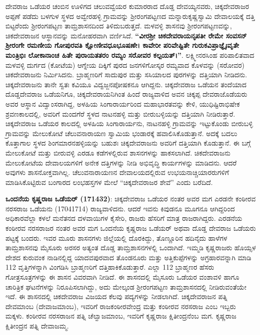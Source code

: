 ದೇವರಾಜ ಒಡೆಯರ ಚಂಬಿನ ಊಳಿಗದ ಚಲುವವ್ವೆಯರ ಕುಮಾರರಾದ ದೊಡ್ಡ ದೇವಯ್ಯನವರು, ಚಿಕ್ಕದೇವರಾಜರ ಅಪ್ಪಣೆ ಪಡೆದು ಬಳಗುಳ ಸ್ಥಳದ ಅವ್ವೇರಹಳ್ಳಿ ಗ್ರಾಮವನ್ನು ಶ‍್ರೀರಂಗಪಟ್ಟಣದ ಮನ್ನಾರುಕೃಷ್ಣಸ್ವಾಮಿ ದೇವಾಲಯಕ್ಕೆ ದತ್ತಿ ಬಿಟ್ಟರೆಂದು ಶ‍್ರೀರಂಗಪಟ್ಟಣ ತಾಮ್ರಶಾಸನದಿಂದ ತಿಳಿದುಬರುತ್ತದೆ. ಮಳವಳ್ಳಿ ಶಾಸನವು ಶ‍್ರೀರಂಗಪಟ್ಟಣವನ್ನು, ಚಿಕದೇವರಾಜನ ಆಸ್ಥಾನವನ್ನು ಮನೋಹರವಾಗಿ ವರ್ಣಿಸಿದೆ. \textbf{“ವೀರಶ‍್ರೀ ಚಿಕದೇವರಾಯನೃಪತೀ ರೇಮೇ ಸಂವಸನ್​ ಶ‍್ರೀರಂಗೇ ರಮಣೀಯ ಗೋಪುರವತಿ ಕ್ಷೋಣೀವಧೂಭೂಷಣೇ। ಕಾವೇರೀ ಪರಿವೇಷ್ಟಿತೇ ಗುರುಕವಿಪ್ರಾಜ್ಞೈಃವೃತೇ ಮಂತ್ರಿಭಿಃ ಲೋಕಾನಾಂಚ ಹಿತೇ ಪುರಾಯತತರಂ ರಮ್ಯಂ ಸರೋವರ ಕಲ್ಪಯತ್​।”}. ಲಕ್ಷ್ಮೀನರಸಿಂಹ ಪರಿಪಾಲಿತವಾದ ಮಳವಳ್ಳಿ ದುರ್ಗದ (ಕೋಟೆಯ) ಆಗ್ನೇಯ ದಿಕ್ಕಿಗೆ ಪುರದ ಜನಗಳಿಗೋಸ್ಕರ ರಮ್ಯವಾದ ಕೊಳವನ್ನು (ಸರೋವರ) ಚಿಕದೇವರಾಜನು ನಿರ್ಮಿಸಿದನು. ಬ್ರಾಹ್ಮಣರಿಗೆ ಸಾದುಪುರ ಮತ್ತು ಸಸಿಯಾಲದ ಪುರಗಳನ್ನು ದತ್ತಿಯಾಗಿ ನೀಡಿದನು. ಚಿಕ್ಕದೇವರಾಜನು ತಾನೇ ಸ್ವತಃ ಕವಿಯೂ ವಿದ್ವಜ್ಜನಪೋಷಕನೂ ಆಗಿದ್ದನು. ಚಿಕ್ಕದೇವರಾಜ ಒಡೆಯನ ತಂದೆಯಾದ ದೊಡ್ಡದೇವರಾಜ ಒಡೆಯನಿಗೂ, ಚಿಕ್ಕದೇವರಾಯನಿಗಿಂತ ಹಿಂದೆ ರಾಜ್ಯವಾಳಿದ ಅವನ ಚಿಕ್ಕಪ್ಪ ದೇವರಾಜೊಡೆಯರು ಅವರ ಆಸ್ಥಾನ ವಿದ್ವಾಂಸ\-ರಾಗಿದ್ದ, ಅಳಹಿಯ ಸಿಂಗಾರಾರ್ಯರಿಂದ ಮಹಾಭಾರತವನ್ನು ಕೇಳಿ, ಯುಧಿಷ್ಟಿರಾಭಿಷೇಕ ಶ್ರವಣಕಾಲದಲ್ಲಿ, ಅವರಿಗೆ ಮಂದಗೆರೆ ಸ್ಥಳದ ನಾಟನಹಳ್ಳಿ ಮತ್ತು ಬೀರುಬಳ್ಳಿಯನ್ನು ದತ್ತಿಯಾಗಿ ನೀಡಿರುತ್ತಾರೆ. ಚಿಕ್ಕದೇವರಾಜ ಒಡೆಯರ ಕಾಲದಲ್ಲಿ ಅಳಹಿಯ ಸಿಂಗಾರಾರ್ಯನು, ನಾಟನಹಳ್ಳಿ ಗ್ರಾಮವನ್ನು ಇಟ್ಟುಕೊಂಡು ಬೀರುಬಳ್ಳಿ ಗ್ರಾಮವನ್ನು ಮೇಲುಕೋಟೆ ಚೆಲುವ\-ನಾರಾಯಣ ಸ್ವಾಮಿಯ ಭಂಡಾರಕ್ಕೆ ಹವಾಲಿಸಿಕೊಡುತ್ತಾನೆ. ಅದಕ್ಕೆ ಬದಲು ಕೊತ್ತಾಗಾಲ ಸ್ಥಳದ ಶಿಂಗಮಾರನಹಳ್ಳಿಯನ್ನು ಬಹುಶಃ ಚಿಕ್ಕದೇವರಾಜನು ಅವರಿಗೆ ದತ್ತಿಯಾಗಿ ಕೊಡುತ್ತಾನೆ. ಈ ಬಗ್ಗೆ ಮೇಲುಕೋಟೆ ಮತ್ತು ಬೀರುವಳ್ಳಿ ಎರಡೂ ಕಡೆಗಳಲ್ಲಿರುವ ಶಾಸನಗಳನ್ನು ಹಾಕಸಲಾಗಿದೆ. ಚಿಕದೇವರಾಜನು ಮೇಲುಕೋಟೆಯ ದೇವಾಲಯಗಳಿಗೆ ಅನೇಕ ದತ್ತಿಗಳನ್ನು ನೀಡಿ ಅಭಿವೃದ್ಧಿ ಕಾರ್ಯಗಳನ್ನು ಮಾಡಿದನು. ಆದರೆ ಅವುಗಳು ಶಾಸನೋಕ್ತವಾಗಿಲ್ಲ. ಚೆಲುವನಾರಾಯಣನ ದೇವಾಲಯದಲ್ಲಿರುವ ಉಭಯನಾಚ್ಚಿಯಾರರುಗಳಿಗೆ ಮಾಡಿಸಿಕೊಟ್ಟಿರುವ ಬಂಗಾರದ ಲಂಭಹಸ್ತಗಳ ಮೇಲೆ “ಚಿಕ್ಕದೇವರಾಜರ ಶೇವೆ” ಎಂದು ಬರೆದಿದೆ.

\textbf{ಒಂದನೆಯ ಕೃಷ್ಣರಾಜ ಒಡೆಯರ್​ (1714\general{\enginline{-}}32)}: ಚಿಕ್ಕದೇವರಾಜ ಒಡೆಯರ ನಂತರ ಅವರ ಮಗ ಎರಡನೇ ಕಂಠೀರವ ನರಸರಾಜ ಒಡೆಯನು (1704\enginline{-}1714) ರಾಜ್ಯವಾಳಿದನು. ಆದರೆ ಇವನು ಕಿವುಡನೂ ಮೂಗನೂ ಆಗಿದ್ದರಿಂದ ಅಧಿಕಾರವೆಲ್ಲಾ ಕಳಲೆ ಮನೆತನದ ದಳವಾಯಿಗಳ ಕೈಸೇರಿ, ರಾಜರು ಹೆಸರಿಗೆ ಮಾತ್ರ ರಾಜರಾಗಿದ್ದರು. ಎರಡನೆಯ ಕಂಠೀರವ ನರಸರಾಜರ ನಂತರ ಅವರ ಮಗ ಒಂದನೆಯ ಕೃಷ್ಣರಾಜ ಒಡೆಯರ್​ ಅಥವಾ ದೊಡ್ಡ ದೇವರಾಜ ಒಡೆಯರು ಪಟ್ಟಕ್ಕೆ ಬಂದರು. ಇವರ ಮೂರು ಶಾಸನಗಳು ಜಿಲ್ಲೆಯಲ್ಲಿ ದೊರಕಿದ್ದು, ತೊಣ್ಣೂರಿನ ಹದಿನೈದು ಹಾಳೆಗಳ ತಾಮ್ರಶಾಸನವು ಮೈಸೂರು ಅರಸರ ಅತ್ಯಂತ ದೊಡ್ಡ ತಾಮ್ರಶಾಸನಗಳಲ್ಲಿ ಒಂದಾಗಿದೆ. ಇಮ್ಮಡಿ ಕೃಷ್ಣರಾಜರು ಹೊಯ್ಸಳ ದೇಶದ ಕುರುವಂಕ ನಾಡಿನಲ್ಲಿದ್ದ ಯಾದವಪುರವಾದ ತೊಂಡನೂರು ಮತ್ತು ಅತ್ತಿಕುಪ್ಪೆಗಳನ್ನು ಅಗ್ರಹಾರವನ್ನಾಗಿ ಮಾಡಿ 112 ವೃತ್ತಿಗಳನ್ನಾಗಿ ವಿಂಗಡಿಸಿ ಬ್ರಾಹ್ಮಣರಿಗೆ ದತ್ತಿಹಾಕಿಕೊಡುತ್ತಾರೆ. ಎಲ್ಲಾ 112 ಬ್ರಾಹ್ಮಣರ ಹೆಸರು ಗೋತ್ರಸೂತ್ರಗಳನ್ನು ಈ ಶಾಸನ ವಿವರವಾಗಿ ನೀಡಿದೆ. ಈ ಶಾಸನದಲ್ಲಿ ಮೈಸೂರು ಒಡೆಯರ ವಂಶಾವಳಿ ಹಾಗೂ ಚಾರಿತ್ರಿಕ ಘಟನೆಗಳನ್ನು ನಿರೂಪಿಸಲಾಗಿದ್ದು, ಅದು ಮೇಲ್ಕಂಡ ಶ‍್ರೀರಂಗಪಟ್ಟಣ ತಾಮ್ರಶಾಸನದಲ್ಲಿ ನೀಡಿರುವಂತೆಯೇ ಇದೆ. ಈ ಶಾಸನದಲ್ಲಿ ಚಿಕದೇವರಾಜ ವಿಜಯದ ಕೆಲವು ಪದ್ಯಗಳನ್ನು ನೀಡಲಾಗಿದೆ. ಚಿಕ್ಕದೇವರಾಜನ ಪತ್ನಿ ದೇವಮಾಂಬ (ದೇವಾಜಮಾಂಬ), ಇವರಿಗೆ ರಾಜಕಂಠೀರವೇಂದ್ರ ಮತ್ತು ಕಂಠೀರವ ನರಸರಾಜ ಎಂಬ ಇಬ್ಬರು ಮಕ್ಕಳು. ಕಂಠೀರವ ನರಸರಾಜನ ಪತ್ನಿ ಚೆಲ್ವಾಜಮಾಂಬ, ಇವರಿಗೆ ಕೃಷ್ಣರಾಜ ಕ್ಷಿತೀಂದ್ರನೆಂಬ ಮಗ. ಕೃಷ್ಣರಾಜ ಕ್ಷಿತೀಂದ್ರನ ಪತ್ನಿ ದೇವಾಜಮ್ಮ.

